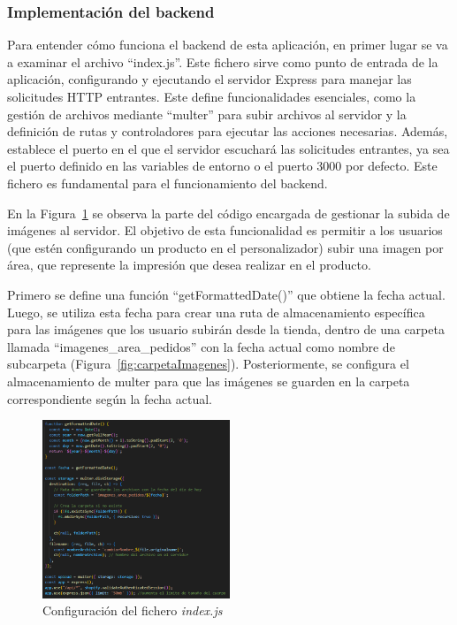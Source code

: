 \documentclass[12pt]{article}
\begin{document}
\clearpage
\subsubsection{Implementación del backend}

Para entender cómo funciona el backend de esta aplicación, en primer lugar se va a examinar el archivo ``index.js''. Este fichero sirve como 
punto de entrada de la aplicación, configurando y ejecutando el servidor Express para manejar las solicitudes HTTP entrantes. Este define funcionalidades
esenciales, como la gestión de archivos mediante ``multer'' para subir archivos al servidor y la definición de rutas y controladores para ejecutar
las acciones necesarias. Además, establece el puerto en el que el servidor escuchará las solicitudes entrantes, ya sea el puerto definido en las 
variables de entorno o el puerto 3000 por defecto. Este fichero es fundamental para el funcionamiento del backend.

En la Figura~\ref{fig:configIndex} se observa la parte del código encargada de gestionar la subida de imágenes al servidor. El objetivo de esta 
funcionalidad es permitir a los usuarios (que estén configurando un producto en el personalizador) subir una imagen por área, que represente la impresión que desea
realizar en el producto. 

Primero se define una función ``getFormattedDate()'' que obtiene la fecha actual. Luego, se utiliza esta fecha para crear una ruta de almacenamiento específica para 
las imágenes que los usuario subirán desde la tienda, dentro de una carpeta llamada ``imagenes\_area\_pedidos'' con la fecha actual como nombre de subcarpeta (Figura~\ref{fig:carpetaImagenes}).
Posteriormente, se configura el almacenamiento de multer para que las imágenes se guarden en la carpeta correspondiente según la fecha actual.

\begin{figure}[ht]
    \centering
    \includegraphics[width=0.5\textwidth]{imagenes-back/configuracionIndexjs.png}
    \caption{\label{fig:configIndex} Configuración del fichero \textit{index.js} }
    \vspace{\fill}
\end{figure}
\end{document}
